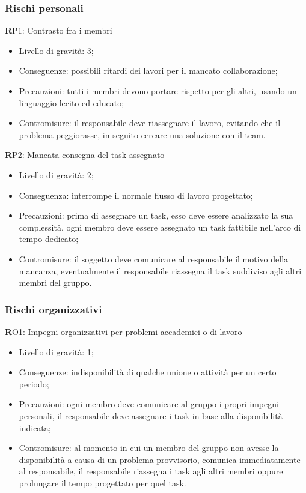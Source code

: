 \subsubsection{Rischi personali}
\textbf RP1: 
Contrasto fra i membri
\begin{itemize}
\item Livello di gravità: 3;
\item Conseguenze: possibili ritardi dei lavori per il mancato collaborazione;
\item Precauzioni: tutti i membri devono portare rispetto per gli altri, usando un linguaggio lecito ed educato;
\item Contromisure: il responsabile deve riassegnare il lavoro, evitando che il problema peggiorasse, in seguito cercare una soluzione con il team.
\end{itemize}
\textbf RP2:
Mancata consegna del task assegnato
\begin{itemize}
\item Livello di gravità: 2;
\item Conseguenza: interrompe il normale flusso di lavoro progettato;
\item Precauzioni: prima di assegnare un task, esso deve essere analizzato la sua complessità, ogni membro deve essere assegnato un task fattibile nell'arco di tempo dedicato;
\item Contromisure: il soggetto deve comunicare al responsabile il motivo della mancanza, eventualmente il responsabile riassegna il task suddiviso agli altri membri del gruppo.
\end{itemize}

\subsubsection{Rischi organizzativi}
\textbf RO1: 
Impegni organizzativi per problemi accademici o di lavoro
\begin{itemize}
\item Livello di gravità: 1;
\item Conseguenze: indisponibilità di qualche unione o attività per un certo periodo;
\item Precauzioni: ogni membro deve comunicare al gruppo i propri impegni personali, il responsabile deve assegnare i task in base alla disponibilità indicata;
\item Contromisure: al momento in cui un membro del gruppo non avesse la disponibilità a causa di un problema provvisorio, comunica immediatamente al responsabile, il responsabile riassegna i task agli altri membri oppure prolungare il tempo progettato per quel task.
\end{itemize}

